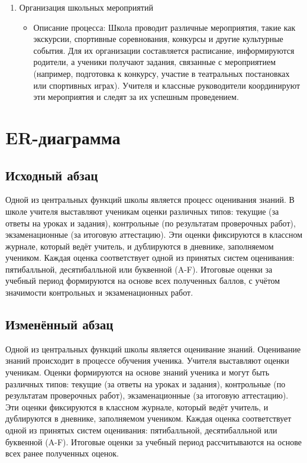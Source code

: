 \documentclass[a4paper, final]{article}
\begin{document}
\begin{enumerate}
  \item Организация школьных мероприятий
  \begin{itemize}
    \item Описание процесса: Школа проводит различные мероприятия, такие как экскурсии, спортивные соревнования, конкурсы и другие культурные события. Для их организации составляется расписание, информируются родители, а ученики получают задания, связанные с мероприятием (например, подготовка к конкурсу, участие в театральных постановках или спортивных играх). Учителя и классные руководители координируют эти мероприятия и следят за их успешным проведением.
  \end{itemize}
\end{enumerate}


\newpage
\section{ER-диаграмма}
\subsection{Исходный абзац}
Одной из центральных функций школы является процесс оценивания знаний. В школе учителя выставляют ученикам оценки различных типов: текущие (за ответы на уроках и задания), контрольные (по результатам проверочных работ), экзаменационные (за итоговую аттестацию). Эти оценки фиксируются в классном журнале, который ведёт учитель, и дублируются в дневнике, заполняемом учеником. Каждая оценка соответствует одной из принятых систем оценивания: пятибалльной, десятибалльной или буквенной (A-F). Итоговые оценки за учебный период формируются на основе всех полученных баллов, с учётом значимости контрольных и экзаменационных работ.

\subsection{Изменённый абзац}
Одной из центральных функций школы является оценивание знаний. Оценивание знаний происходит в процессе обучения ученика. Учителя выставляют оценки ученикам. Оценки формируются на основе знаний ученика и могут быть различных типов: текущие (за ответы на уроках и задания), контрольные (по результатам проверочных работ), экзаменационные (за итоговую аттестацию). Эти оценки фиксируются в классном журнале, который ведёт учитель, и дублируются в дневнике, заполняемом учеником. Каждая оценка соответствует одной из принятых систем оценивания: пятибалльной, десятибалльной или буквенной (A-F). Итоговые оценки за учебный период рассчитываются на основе всех ранее полученных оценок.
\end{document}
